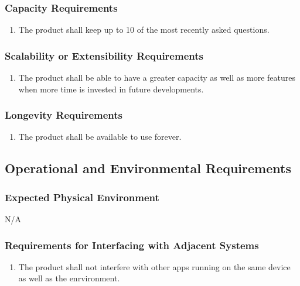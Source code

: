 \documentclass[]{article}
\begin{document}
\subsubsection{Capacity Requirements}
\label{ssub:capacity_requirements}
\begin{enumerate}[{PR}6. ]
	\item The product shall keep up to 10 of the most recently asked questions.
\end{enumerate}

\subsubsection{Scalability or Extensibility Requirements}
\label{ssub:scalability_or_extensibility_requirements}
\begin{enumerate}[{PR}7. ]
	\item The product shall be able to have a greater capacity as well as more features when more time is invested in future developments.
\end{enumerate}

\subsubsection{Longevity Requirements}
\label{ssub:longevity_requirements}
\begin{enumerate}[{PR}8. ]
	\item The product shall be available to use forever.
\end{enumerate}


\subsection{Operational and Environmental Requirements}
\label{sub:operational_and_environmental_requirements}

\subsubsection{Expected Physical Environment}
\label{ssub:expected_physical_environment}
N/A

\subsubsection{Requirements for Interfacing with Adjacent Systems}
\label{ssub:requirements_for_interfacing_with_adjacent_systems}
\begin{enumerate}[{OE}1. ]
	\item The product shall not interfere with other apps running on the same device as well as the enrvironment.
\end{enumerate}
\end{document}
